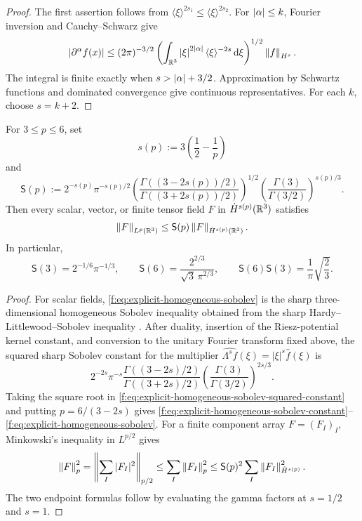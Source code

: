 \begin{proof}
The first assertion follows from
\(\langle\xi\rangle^{2s_1}\le\langle\xi\rangle^{2s_2}\).
For \(\left|\alpha\right|\le k\), Fourier inversion and Cauchy--Schwarz give
\[
 \left|\partial^\alpha f(x)\right|
 \le(2\pi)^{-3/2}
 \left(\int_{\mathbb R^3}\left|\xi\right|^{2\left|\alpha\right|}
 \langle\xi\rangle^{-2s}\,\mathrm d\xi\right)^{1/2}
 \left\lVert f\right\rVert_{H^s}.
\]
The integral is finite exactly when \(s>\left|\alpha\right|+3/2\).
Approximation by Schwartz functions and dominated convergence give continuous
representatives.  For each \(k\), choose \(s=k+2\).
\end{proof}

\begin{lemma}
\label{f:lem:explicit-homogeneous-sobolev}
For \(3\le p\le6\), set
\[
 s(p):=3\left(\frac12-\frac1p\right)
\]
and
\begin{equation}
 \mathsf S(p):=
 2^{-s(p)}\pi^{-s(p)/2}
 \left(
  \frac{\Gamma((3-2s(p))/2)}
       {\Gamma((3+2s(p))/2)}
 \right)^{1/2}
 \left(\frac{\Gamma(3)}{\Gamma(3/2)}\right)^{s(p)/3}.
 \label{f:eq:explicit-homogeneous-sobolev-constant}
\end{equation}
Then every scalar, vector, or finite tensor field \(F\) in
\(\dot H^{s(p)}(\mathbb R^3)\) satisfies
\begin{equation}
 \left\lVert F\right\rVert_{L^p(\mathbb R^3)}
 \le \mathsf S(p)\left\lVert F\right\rVert_{\dot H^{s(p)}(\mathbb R^3)}.
 \label{f:eq:explicit-homogeneous-sobolev}
\end{equation}
In particular,
\[
 \mathsf S(3)=2^{-1/6}\pi^{-1/3},
 \qquad
 \mathsf S(6)=\frac{2^{2/3}}{\sqrt3\,\pi^{2/3}},
 \qquad
 \mathsf S(6)\mathsf S(3)=\frac1\pi\sqrt{\frac23}.
\]
\end{lemma}

\begin{proof}
For scalar fields, \eqref{f:eq:explicit-homogeneous-sobolev} is the sharp
three-dimensional homogeneous Sobolev inequality obtained from the sharp
Hardy--Littlewood--Sobolev inequality \cite{Lieb1983}.  After duality,
insertion of the Riesz-potential kernel constant, and conversion to the
unitary Fourier transform fixed above, the squared sharp Sobolev constant for
the multiplier
\(\widehat{\Lambda^sf}(\xi)=|\xi|^s\widehat f(\xi)\) is
\begin{equation}
 2^{-2s}\pi^{-s}
 \frac{\Gamma((3-2s)/2)}{\Gamma((3+2s)/2)}
 \left(\frac{\Gamma(3)}{\Gamma(3/2)}\right)^{2s/3}.
 \label{f:eq:explicit-homogeneous-sobolev-squared-constant}
\end{equation}
Taking the square root in
\eqref{f:eq:explicit-homogeneous-sobolev-squared-constant} and putting
\(p=6/(3-2s)\) gives
\eqref{f:eq:explicit-homogeneous-sobolev-constant}--
\eqref{f:eq:explicit-homogeneous-sobolev}.  For a finite component array
\(F=(F_I)_I\), Minkowski's inequality in \(L^{p/2}\) gives
\[
 \left\lVert F\right\rVert_p^2
 =\left\|\sum_I|F_I|^2\right\|_{p/2}
 \le\sum_I\left\lVert F_I\right\rVert_p^2
 \le\mathsf S(p)^2\sum_I\left\lVert F_I\right\rVert_{\dot H^{s(p)}}^2.
\]
The two endpoint formulas follow by evaluating the gamma factors at
\(s=1/2\) and \(s=1\).
\end{proof}

